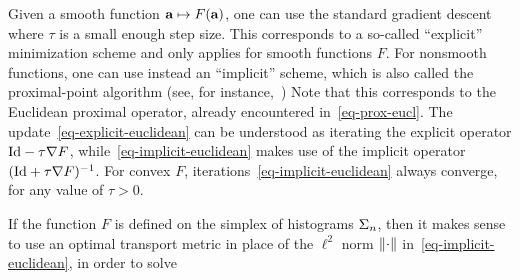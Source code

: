 Given a smooth function $\mathrm{\textbf{a}} \mapsto F(\mathrm{\textbf{a}})$, one can use the standard gradient descent
where $\tau$ is a small enough step size. This corresponds to a so-called ``explicit'' minimization scheme and only applies for smooth functions $F$. For nonsmooth functions, one can use instead an ``implicit'' scheme, which is also called the proximal-point algorithm (see, for instance,~\citet{BauschkeCombettes11})
Note that this corresponds to the Euclidean proximal operator, already encountered in~\eqref{eq-prox-eucl}.
%
The update~\eqref{eq-explicit-euclidean} can be understood as iterating the explicit operator $\mathrm{Id}-\tau\nabla F$, while~\eqref{eq-implicit-euclidean} makes use of the implicit operator $(\mathrm{Id}+\tau\nabla F)^{-1}$. For convex $F$, iterations~\eqref{eq-implicit-euclidean} always converge, for any value of $\tau>0$. 

If the function $F$ is defined on the simplex of histograms $\Sigma_n$, then it makes sense to use an optimal transport metric in place of the $\ell^2$ norm $\left\| \cdot \right\|$ in~\eqref{eq-implicit-euclidean}, in order to solve

